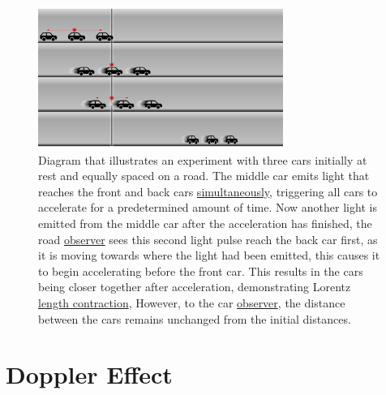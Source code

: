 \begin{figure}[ht]
	\centering
	\includegraphics[width=8cm]{images/pdf/cars.pdf}
	\caption{Diagram that illustrates an experiment with three cars initially at rest and equally spaced on a road. The middle car emits light that reaches the front and back cars \protect\hyperlink{def-simultaneity}{simultaneously}, triggering all cars to accelerate for a predetermined amount of time. Now another light is emitted from the middle car after the acceleration has finished, the road \protect\hyperlink{def-observer}{observer} sees this second light pulse reach the back car first, as it is moving towards where the light had been emitted, this causes it to begin accelerating before the front car. This results in the cars being closer together after acceleration, demonstrating Lorentz \protect\hyperlink{def-length-contraction}{length contraction}, However, to the car \protect\hyperlink{def-observer}{observer}, the distance between the cars remains unchanged from the initial distances.}
	\label{fig: cars}
\end{figure}

\section{Doppler Effect}

